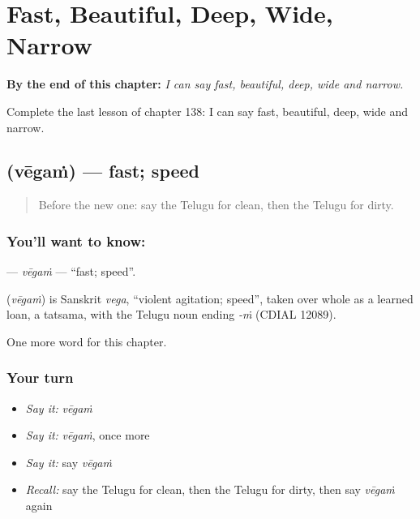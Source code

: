 
\chapter{Fast, Beautiful, Deep, Wide, Narrow}
\label{ch:te-fast-beautiful-deep-wide-narrow}

\begin{chapteropening}
\textbf{By the end of this chapter:} \emph{I can say fast, beautiful, deep, wide and narrow.}

Complete the last lesson of chapter 138: I can say fast, beautiful, deep, wide and narrow.
\end{chapteropening}

\section[\texorpdfstring{\te{వేగం} (vēgaṁ)}{వేగం (vēgaṁ)}]{ (vēgaṁ) — fast; speed}

\label{lesson:TE-C138-vegam}



\begin{quote}
Before the new one: say the Telugu for clean, then the Telugu for dirty.
\end{quote}

\subsection*{You'll want to know: }
\textbf{} — \emph{vēgaṁ} — \textquotedblleft{}fast; speed\textquotedblright{}.

\begin{cousinweb}
\textbf{} (\emph{vēgaṁ}) is Sanskrit \emph{vega}, \textquotedblleft{}violent agitation; speed\textquotedblright{}, taken over whole as a learned loan, a tatsama, with the Telugu noun ending \emph{-ṁ} (CDIAL 12089).
\end{cousinweb}

\begin{grammarlens}[title={What you've built}]
One more word for this chapter.
\end{grammarlens}

\subsection*{Your turn}
\begin{itemize}
\raggedright
  \item \emph{Say it:} \emph{vēgaṁ}
  \item \emph{Say it:} \emph{vēgaṁ}, once more
  \item \emph{Say it:} say \emph{vēgaṁ}
  \item \emph{Recall:} say the Telugu for clean, then the Telugu for dirty, then say \emph{vēgaṁ} again
\end{itemize}

